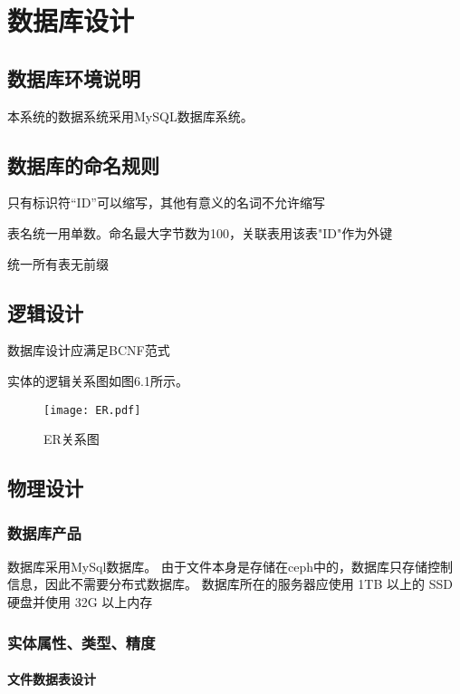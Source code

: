 \chapter{数据库设计}
\section{数据库环境说明}
本系统的数据系统采用MySQL数据库系统。

\section{数据库的命名规则}
只有标识符“ID”可以缩写，其他有意义的名词不允许缩写

表名统一用单数。命名最大字节数为100，关联表用该表"ID"作为外键

统一所有表无前缀

\section{逻辑设计}
数据库设计应满足BCNF范式

实体的逻辑关系图如图6.1所示。
\begin{figure}
    \centering
    \texttt{[image: ER.pdf]}
    \caption{ER关系图}\label{fig:noted-figure}
\end{figure}

\section{物理设计}
\subsection{数据库产品}
数据库采用MySql数据库。
由于文件本身是存储在ceph中的，数据库只存储控制信息，因此不需要分布式数据库。
数据库所在的服务器应使用 1TB 以上的 SSD 硬盘并使用 32G 以上内存

\subsection{实体属性、类型、精度}
\subsubsection{文件数据表设计}

